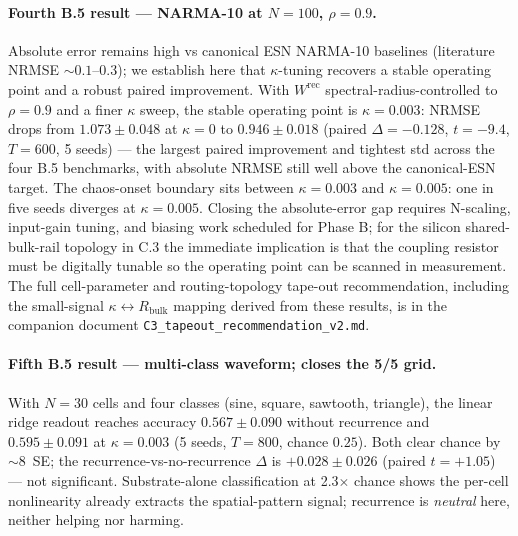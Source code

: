 \documentclass[fontsize=10pt]{article}
\begin{document}
\paragraph{Fourth B.5 result --- NARMA-10 at $N=100$, $\rho=0.9$.}
Absolute error remains high vs canonical ESN NARMA-10 baselines (literature
NRMSE $\sim 0.1$--$0.3$); we establish here that $\kappa$-tuning recovers a
stable operating point and a robust paired improvement. With $W^{\mathrm{rec}}$
spectral-radius-controlled to $\rho=0.9$ and a finer $\kappa$ sweep, the
stable operating point is $\kappa=0.003$: NRMSE drops from $1.073 \pm 0.048$
at $\kappa=0$ to $\mathbf{0.946 \pm 0.018}$ (paired $\Delta = -0.128$,
$t = -9.4$, $T=600$, 5 seeds) --- the largest paired improvement and tightest
std across the four B.5 benchmarks, with absolute NRMSE still well above the
canonical-ESN target. The chaos-onset boundary sits between $\kappa=0.003$
and $\kappa=0.005$: one in five seeds diverges at $\kappa=0.005$. Closing
the absolute-error gap requires N-scaling, input-gain tuning, and biasing
work scheduled for Phase B; for the silicon shared-bulk-rail topology in
C.3 the immediate implication is that the coupling resistor must be
digitally tunable so the operating point can be scanned in measurement.
The full cell-parameter and routing-topology tape-out recommendation,
including the small-signal $\kappa \leftrightarrow R_{\mathrm{bulk}}$
mapping derived from these results, is in the companion document
\texttt{C3\_tapeout\_recommendation\_v2.md}.

\paragraph{Fifth B.5 result --- multi-class waveform; closes the 5/5 grid.}
With $N=30$ cells and four classes (sine, square, sawtooth, triangle),
the linear ridge readout reaches accuracy $0.567 \pm 0.090$ without
recurrence and $0.595 \pm 0.091$ at $\kappa=0.003$ (5 seeds, $T=800$,
chance $0.25$). Both clear chance by $\sim 8$~SE; the recurrence-vs-no-recurrence
$\Delta$ is $+0.028 \pm 0.026$ (paired $t = +1.05$) --- not significant.
Substrate-alone classification at 2.3$\times$ chance shows the per-cell
nonlinearity already extracts the spatial-pattern signal; recurrence
is \emph{neutral} here, neither helping nor harming.
\end{document}
